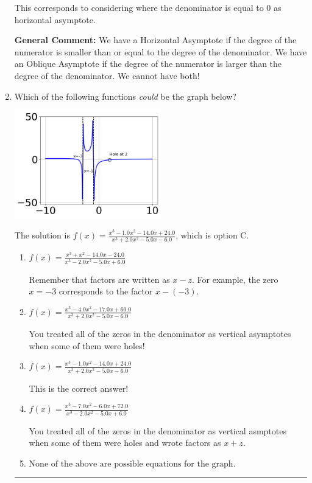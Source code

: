 \documentclass{extbook}[14pt]
\newcommand{\litem}[1]{\item #1

\rule{\textwidth}{0.4pt}}
\begin{document}
\begin{enumerate}
{\begin{enumerate}[label=\Alph*.]
This corresponds to considering where the denominator is equal to 0 as horizontal asymptote.
\end{enumerate}

\textbf{General Comment:} We have a Horizontal Asymptote if the degree of the numerator is smaller than or equal to the degree of the denominator. We have an Oblique Asymptote if the degree of the numerator is larger than the degree of the denominator. We cannot have both!
}
\litem{
Which of the following functions \textit{could} be the graph below?

\begin{center}
    \includegraphics[width=0.5\textwidth]{../Figures/identifyGraphOfRationalFunctionCopyB.png}
\end{center}


The solution is \( f(x)=\frac{x^{3} -1.0 x^{2} -14.0 x + 24.0}{x^{3} +2.0 x^{2} -5.0 x -6.0} \), which is option C.\begin{enumerate}[label=\Alph*.]
\item \( f(x)=\frac{x^{3} + x^{2} -14.0 x -24.0}{x^{3} -2.0 x^{2} -5.0 x + 6.0} \)

Remember that factors are written as $x-z$. For example, the zero $x=-3$ corresponds to the factor $x-(-3)$.
\item \( f(x)=\frac{x^{3} -4.0 x^{2} -17.0 x + 60.0}{x^{3} +2.0 x^{2} -5.0 x -6.0} \)

You treated all of the zeros in the denominator as vertical asymptotes when some of them were holes!
\item \( f(x)=\frac{x^{3} -1.0 x^{2} -14.0 x + 24.0}{x^{3} +2.0 x^{2} -5.0 x -6.0} \)

This is the correct answer!
\item \( f(x)=\frac{x^{3} -7.0 x^{2} -6.0 x + 72.0}{x^{3} -2.0 x^{2} -5.0 x + 6.0} \)

You treated all of the zeros in the denominator as vertical asmptotes when some of them were holes and wrote factors as $x+z$.
\item \( \text{None of the above are possible equations for the graph.} \)


\end{enumerate}}
\end{enumerate}
\end{document}
